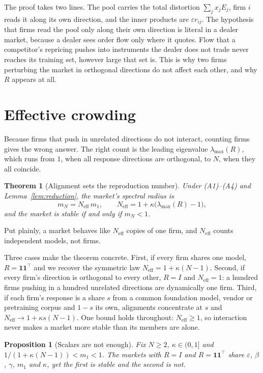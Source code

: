 \documentclass[conference]{IEEEtran}
\theoremstyle{plain}
\newtheorem{theorem}{Theorem}
\newtheorem{proposition}{Proposition}
\newcommand{\Neff}{N_{\mathrm{eff}}}
\newcommand{\mN}{m_N}
\newcommand{\lmax}{\lambda_{\max}}
\newcommand{\one}{\mathbf{1}}
\begin{document}
The proof takes two lines. The pool carries the total distortion $\sum_j x_jE_j$, firm $i$ reads it along its own direction, and the inner products are $\varepsilon r_{ij}$. The hypothesis that firms read the pool only along their own direction is literal in a dealer market, because a dealer sees order flow only where it quotes. Flow that a competitor's repricing pushes into instruments the dealer does not trade never reaches its training set, however large that set is. This is why two firms perturbing the market in orthogonal directions do not affect each other, and why $R$ appears at all.

\section{Effective crowding}
\label{sec:crowding}

Because firms that push in unrelated directions do not interact, counting firms gives the wrong answer. The right count is the leading eigenvalue $\lmax(R)$, which runs from $1$, when all response directions are orthogonal, to $N$, when they all coincide.

\begin{theorem}[Alignment sets the reproduction number]
\label{thm:alignment}
Under (A1)--(A4) and Lemma~\ref{lem:reduction}, the market's spectral radius is
\begin{equation}
\mN=\Neff\,m_1,\qquad \Neff=1+\kappa\bigl(\lmax(R)-1\bigr),
\end{equation}
and the market is stable if and only if $\mN<1$.
\end{theorem}

Put plainly, a market behaves like $\Neff$ copies of one firm, and $\Neff$ counts independent models, not firms.

Three cases make the theorem concrete. First, if every firm shares one model, $R=\one\one^{\top}$ and we recover the symmetric law $\Neff=1+\kappa(N-1)$. Second, if every firm's direction is orthogonal to every other, $R=I$ and $\Neff=1$: a hundred firms pushing in a hundred unrelated directions are dynamically one firm. Third, if each firm's response is a share $s$ from a common foundation model, vendor or pretraining corpus and $1-s$ its own, alignments concentrate at $s$ and $\Neff\to1+\kappa s(N-1)$. One bound holds throughout: $\Neff\ge1$, so interaction never makes a market more stable than its members are alone.

\begin{proposition}[Scalars are not enough]
\label{prop:witness}
Fix $N\ge2$, $\kappa\in(0,1]$ and $1/(1+\kappa(N-1))<m_1<1$. The markets with $R=I$ and $R=\one\one^{\top}$ share $\varepsilon$, $\beta$, $\gamma$, $m_1$ and $\kappa$, yet the first is stable and the second is not.
\end{proposition}
\end{document}
